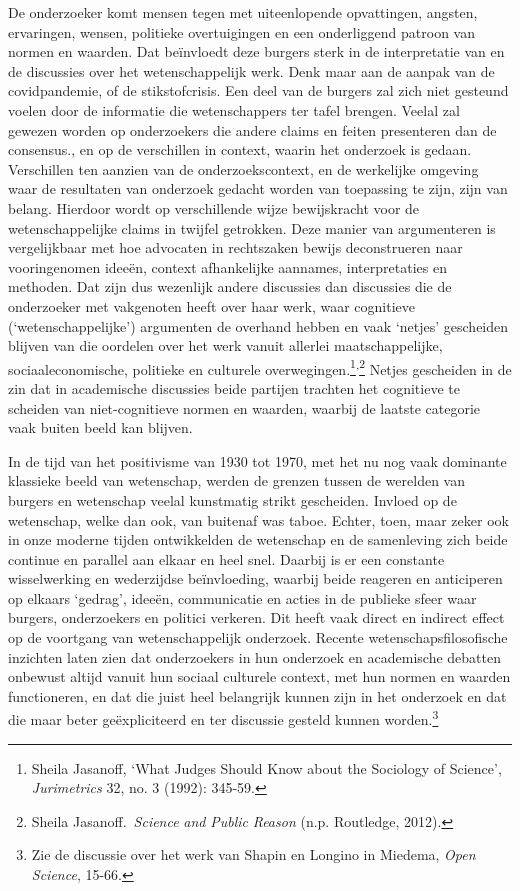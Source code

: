 \documentclass[smallauthor, chapterhaspagenum, nochapterinheader, pagenuminheader,  bigchapnum,medium2, tocpages,  garamond, titleinheader]{jote-book}
\begin{document}
	De onderzoeker komt mensen tegen met uiteenlopende opvattingen, angsten, ervaringen, wensen, politieke overtuigingen en een onderliggend patroon van normen en waarden. Dat beïnvloedt deze burgers sterk in de interpretatie van en de discussies over het wetenschappelijk werk. Denk maar aan de aanpak van de covidpandemie, of de stikstofcrisis. Een deel van de burgers zal zich niet gesteund voelen door de informatie die wetenschappers ter tafel brengen. Veelal zal gewezen worden op onderzoekers die andere claims en feiten presenteren dan de consensus., en op de verschillen in context, waarin het onderzoek is gedaan. Verschillen ten aanzien van de onderzoekscontext, en de werkelijke omgeving waar de resultaten van onderzoek gedacht worden van toepassing te zijn, zijn van belang. Hierdoor wordt op verschillende wijze bewijskracht voor de wetenschappelijke claims in twijfel getrokken. Deze manier van argumenteren is vergelijkbaar met hoe advocaten in rechtszaken bewijs deconstrueren naar vooringenomen ideeën, context afhankelijke aannames, interpretaties en methoden. Dat zijn dus wezenlijk andere discussies dan discussies die de onderzoeker met vakgenoten heeft over haar werk, waar cognitieve (‘wetenschappelijke') argumenten de overhand hebben en vaak ‘netjes' gescheiden blijven van die oordelen over het werk vanuit allerlei maatschappelijke, sociaaleconomische, politieke en culturele overwegingen.\footnote{Sheila Jasanoff, ‘What Judges Should Know about the Sociology of Science', \emph{Jurimetrics} 32, no. 3 (1992): 345-59.}\textsuperscript{,}\footnote{Sheila Jasanoff. \emph{Science}\emph{ }\emph{and}\emph{ Public }\emph{Reason} (n.p. Routledge, 2012).} Netjes gescheiden in de zin dat in academische discussies beide partijen trachten het cognitieve te scheiden van niet-cognitieve normen en waarden, waarbij de laatste categorie vaak buiten beeld kan blijven.



	In de tijd van het positivisme van 1930 tot 1970, met het nu nog vaak dominante klassieke beeld van wetenschap, werden de grenzen tussen de werelden van burgers en wetenschap veelal kunstmatig strikt gescheiden. Invloed op de wetenschap, welke dan ook, van buitenaf was taboe. Echter, toen, maar zeker ook in onze moderne tijden ontwikkelden de wetenschap en de samenleving zich beide continue en parallel aan elkaar en heel snel. Daarbij is er een constante wisselwerking en wederzijdse beïnvloeding, waarbij beide reageren en anticiperen op elkaars ‘gedrag', ideeën, communicatie en acties in de publieke sfeer waar burgers, onderzoekers en politici verkeren. Dit heeft vaak direct en indirect effect op de voortgang van wetenschappelijk onderzoek. Recente wetenschapsfilosofische inzichten laten zien dat onderzoekers in hun onderzoek en academische debatten onbewust altijd vanuit hun sociaal culturele context, met hun normen en waarden functioneren, en dat die juist heel belangrijk kunnen zijn in het onderzoek en dat die maar beter geëxpliciteerd en ter discussie gesteld kunnen worden.\footnote{Zie de discussie over het werk van Shapin en Longino in Miedema, \emph{Open }\emph{Science}, 15-66.}
\end{document}
